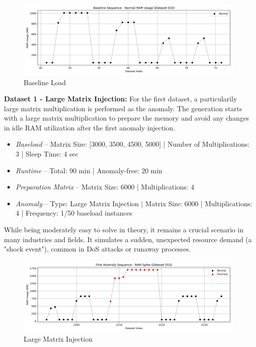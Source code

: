 \documentclass[12pt,oneside]{article}
\begin{document}
\begin{figure}[H] %
    \centering %
    \includegraphics[width=\textwidth]{baseline_sequence}
    \caption{Baseline Load}
    \label{fig:baseline} %
\end{figure}

\textbf{Dataset 1 - Large Matrix Injection:} For the first dataset, a particularily large matrix multiplication is performed as the anomaly. The generation starts with a large matrix multiplication to prepare the memory and avoid any changes in idle RAM utilization after the first anomaly injection. 
\begin{itemize}
    \item \textit{Baseload} -- Matrix Size: [3000, 3500, 4500, 5000] | Number of Multiplications: 3 | Sleep Time: 4 sec
    \item \textit{Runtime} -- Total: 90 min | Anomaly-free: 20 min 
    \item \textit{Preparation Matrix} -- Matrix Size: 6000 | Multiplications: 4
    \item \textit{Anomaly} -- Type: Large Matrix Injection | Matrix Size: 6000 | Multiplications: 4 | Frequency: 1/50 baseload instances
\end{itemize}

While being moderately easy to solve in theory, it remains a crucial scenario in many industries and fields. It simulates a sudden, unexpected resource demand (a "shock event"), common in DoS attacks or runaway processes.

\begin{figure}[H] %
    \centering %
    \includegraphics[width=\textwidth]{anomaly_sequence_10}
    \caption{Large Matrix Injection}
    \label{fig:anomaly_10} %
\end{figure}
\end{document}
